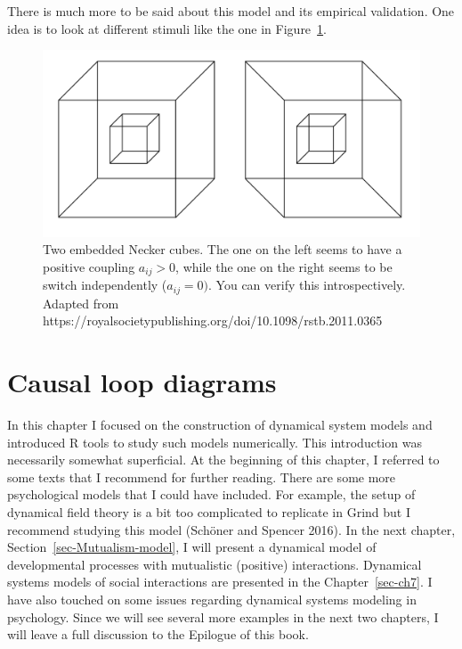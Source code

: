 \documentclass[
  a4paper,
  DIV=11,
  numbers=noendperiod,
  oneside]{scrreprt}
\begin{document}
There is much more to be said about this model and its empirical
validation. One idea is to look at different stimuli like the one in
Figure~\ref{fig-ch4n-img20-old-68}.

\begin{figure}

{\centering \includegraphics{media/ch4n/ch4n-20__figure69.png}

}

\caption{\label{fig-ch4n-img20-old-68}Two embedded Necker cubes. The one
on the left seems to have a positive coupling \(a_{ij} > 0\), while the
one on the right seems to be switch independently (\(a_{ij} = 0)\). You
can verify this introspectively. Adapted from
https://royalsocietypublishing.org/doi/10.1098/rstb.2011.0365}

\end{figure}

\hypertarget{sec-Causal-loop-diagrams}{%
\section{Causal loop diagrams}\label{sec-Causal-loop-diagrams}}

In this chapter I focused on the construction of dynamical system models
and introduced R tools to study such models numerically. This
introduction was necessarily somewhat superficial. At the beginning of
this chapter, I referred to some texts that I recommend for further
reading. There are some more psychological models that I could have
included. For example, the setup of dynamical field theory is a bit too
complicated to replicate in Grind but I recommend studying this model
(Schöner and Spencer 2016). In the next chapter,
Section~\ref{sec-Mutualism-model}, I will present a dynamical model of
developmental processes with mutualistic (positive) interactions.
Dynamical systems models of social interactions are presented in the
Chapter~\ref{sec-ch7}. I have also touched on some issues regarding
dynamical systems modeling in psychology. Since we will see several more
examples in the next two chapters, I will leave a full discussion to the
Epilogue of this book.
\end{document}
